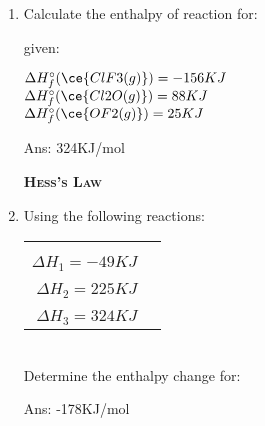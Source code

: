\documentclass[main.tex]{subfiles}
\begin{document}
\begin{multicols*}{2}
\begin{enumerate}
\item Calculate the enthalpy of reaction for:
\begin{center}\end{center}
given:
\begin{center}
$\Delta H^{\circ}_f(\ce{ClF3(g)})=-156KJ$\\
$\Delta H^{\circ}_f(\ce{Cl2O(g)})=88KJ$\\
$\Delta H^{\circ}_f(\ce{OF2(g)})=25KJ$
\end{center}
\begin{flushright}\small Ans: 324KJ/mol\end{flushright}


{\raggedright\textsc{\textbf{Hess's Law }}\par}
\item Using the following reactions:\\
\begin{tabularx}{\columnwidth}{>{}m{.65\linewidth} *{2}{Y} }
   \\
   \\
    \\
   \\
    \\
   \\
    \\
\end{tabularx}\\
Determine the enthalpy change for:
\begin{center}\end{center}
\begin{flushright}\small Ans: -178KJ/mol\end{flushright}


\end{enumerate}
\end{multicols*}
\end{document}

